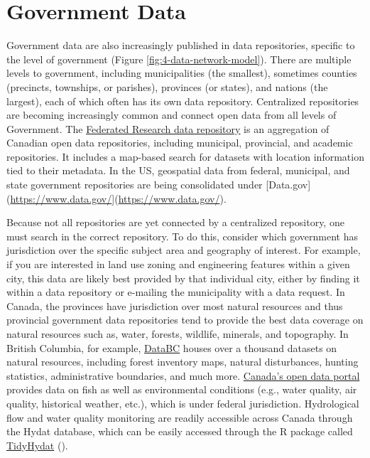 \documentclass[
]{book}
\begin{document}
\hypertarget{government-data}{%
\section{Government Data}\label{government-data}}

Government data are also increasingly published in data repositories, specific to the level of government (Figure \ref{fig:4-data-network-model}). There are multiple levels to government, including municipalities (the smallest), sometimes counties (precincts, townships, or parishes), provinces (or states), and nations (the largest), each of which often has its own data repository. Centralized repositories are becoming increasingly common and connect open data from all levels of Government. The \href{https://www.frdr-dfdr.ca/repo/}{Federated Research data repository} is an aggregation of Canadian open data repositories, including municipal, provincial, and academic repositories. It includes a map-based search for datasets with location information tied to their metadata. In the US, geospatial data from federal, municipal, and state government repositories are being consolidated under {[}Data.gov{]}(\url{https://www.data.gov/}{]}(\url{https://www.data.gov/}).

Because not all repositories are yet connected by a centralized repository, one must search in the correct repository. To do this, consider which government has jurisdiction over the specific subject area and geography of interest. For example, if you are interested in land use zoning and engineering features within a given city, this data are likely best provided by that individual city, either by finding it within a data repository or e-mailing the municipality with a data request. In Canada, the provinces have jurisdiction over most natural resources and thus provincial government data repositories tend to provide the best data coverage on natural resources such as, water, forests, wildlife, minerals, and topography. In British Columbia, for example, \href{https://www.data.gov.bc.ca/}{DataBC} houses over a thousand datasets on natural resources, including forest inventory maps, natural disturbances, hunting statistics, administrative boundaries, and much more. \href{https://open.canada.ca/en/open-data}{Canada's open data portal} provides data on fish as well as environmental conditions (e.g., water quality, air quality, historical weather, etc.), which is under federal jurisdiction. Hydrological flow and water quality monitoring are readily accessible across Canada through the Hydat database, which can be easily accessed through the R package called \href{https://cran.r-project.org/web/packages/tidyhydat/vignettes/tidyhydat_an_introduction.html}{TidyHydat} (\citet{albers_tidyhydat_2017}).
\end{document}

